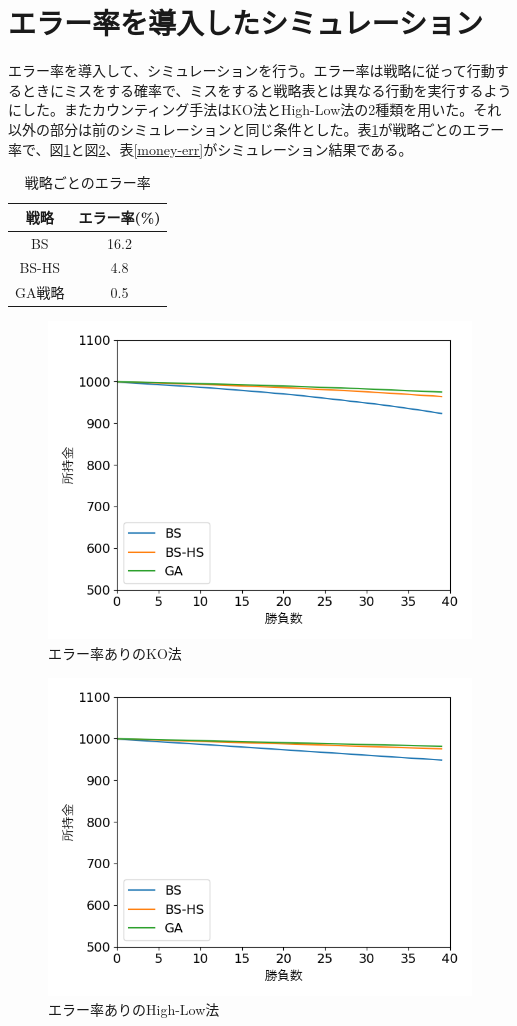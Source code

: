 \section{エラー率を導入したシミュレーション}
エラー率を導入して、シミュレーションを行う。エラー率は戦略に従って行動するときにミスをする確率で、ミスをすると戦略表とは異なる行動を実行するようにした。またカウンティング手法はKO法とHigh-Low法の2種類を用いた。それ以外の部分は前のシミュレーションと同じ条件とした。表\ref{err}が戦略ごとのエラー率で、図\ref{errKO}と図\ref{errHi-Lo}、表\ref{money-err}がシミュレーション結果である。
\begin{table}[H]
 \caption{戦略ごとのエラー率\label{err}}
 \begin{center}
  \begin{tabular}{|c|c|}
  \hline 戦略 & エラー率(\%) \\
  \hline BS & 16.2\\
  \hline BS-HS & 4.8 \\
  \hline GA戦略 & 0.5\\
  \hline
  \end{tabular}
 \end{center}
\end{table}

\begin{figure}[H]
 \begin{center} 
  \includegraphics[width=0.7\linewidth]{./figure/betsimulation-errKO}
  \caption{エラー率ありのKO法\label{errKO}}
 \end{center}
\end{figure}

\begin{figure}[H]
 \begin{center} 
  \includegraphics[width=0.7\linewidth]{./figure/betsimulation-errHi-Lo}
  \caption{エラー率ありのHigh-Low法\label{errHi-Lo}}
 \end{center}
\end{figure}

